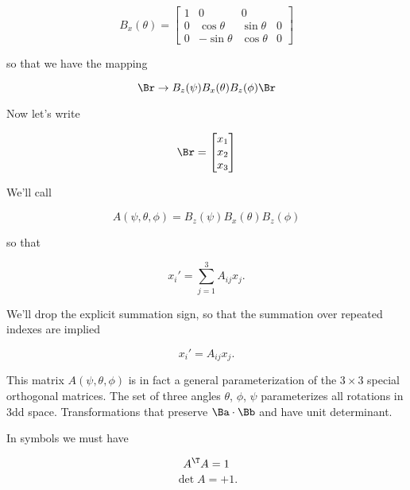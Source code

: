 \begin{equation}\label{eqn:classicalMechanicsEulerAngles:n}
B_x(\theta) =
\begin{bmatrix}
1 & 0 & 0 \\
0 & \cos\theta & \sin\theta & 0 \\
0 & -\sin\theta & \cos\theta & 0 
\end{bmatrix}
\end{equation}

so that we have the mapping

\begin{equation}\label{eqn:classicalMechanicsEulerAngles:n}
\Br \rightarrow B_z(\psi) B_x(\theta) B_z(\phi) \Br
\end{equation}

Now let's write

\begin{equation}\label{eqn:classicalMechanicsEulerAngles:n}
\Br = 
\begin{bmatrix}
x_1 \\
x_2 \\
x_3
\end{bmatrix}
\end{equation}

We'll call

\begin{equation}\label{eqn:classicalMechanicsEulerAngles:n}
A(\psi, \theta, \phi) = B_z(\psi) B_x(\theta) B_z(\phi) 
\end{equation}

so that

\begin{equation}\label{eqn:classicalMechanicsEulerAngles:n}
x_i' = \sum_{j = 1}^3 A_{ij} x_j.
\end{equation}

We'll drop the explicit summation sign, so that the summation over repeated indexes are implied

\begin{equation}\label{eqn:classicalMechanicsEulerAngles:n}
x_i' = A_{ij} x_j.
\end{equation}

This matrix $A(\psi, \theta, \phi)$ is in fact a general parameterization of the $3 \times 3$ special orthogonal matrices. The set of three angles $\theta$, $\phi$, $\psi$ parameterizes all rotations in 3dd space.  Transformations that preserve $\Ba \cdot \Bb$ and have unit determinant.

In symbols we must have

\begin{equation}\label{eqn:classicalMechanicsEulerAngles:n}
A^\T A = 1
\end{equation}
\begin{equation}\label{eqn:classicalMechanicsEulerAngles:n}
\det A = +1.
\end{equation}

